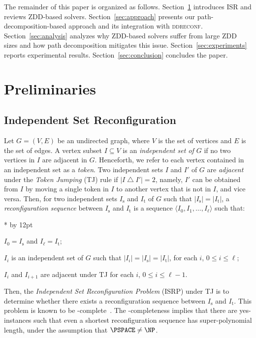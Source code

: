 \documentclass[conference]{IEEEtran}
\newenvironment{listing}[1]{%
        \begin{list}{*}{%
                 \settowidth{\labelwidth}{#1}%
                 \setlength{\leftmargin}{\labelwidth}%
                 \advance \leftmargin by 12pt
                   \setlength{\itemsep}{0pt}%
}%
}{%
\end{list}}
\newcommand{\ini}{\mathrm{s}}
\newcommand{\tar}{\mathrm{t}}
\begin{document}
The remainder of this paper is organized as follows.
Section~\ref{sec:preliminaries} introduces ISR and reviews ZDD-based solvers.
Section~\ref{sec:approach} presents our path-decomposition-based approach and its
integration with \textsc{ddreconf}.
Section~\ref{sec:analysis} analyzes why ZDD-based solvers suffer from large ZDD
sizes and how path decomposition mitigates this issue.
Section~\ref{sec:experiments} reports experimental results.
Section~\ref{sec:conclusion} concludes the paper.



\section{Preliminaries}
\label{sec:preliminaries}

\subsection{Independent Set Reconfiguration}
\label{subsec:isr}


Let $G=(V,E)$ be an undirected graph, where $V$ is the set of vertices and $E$
is the set of edges. A vertex subset $I\subseteq V$ is an \emph{independent set
of $G$} if no two vertices in $I$ are adjacent in $G$.
Henceforth, we refer to each vertex contained in an independent set as a
\emph{token}.
Two independent sets $I$ and $I'$ of $G$ are \emph{adjacent} under the
\emph{Token Jumping} (TJ) rule if $|I \bigtriangleup I'| = 2$, namely, $I'$ can
be obtained from $I$ by moving a single token in $I$ to another vertex that is
not in $I$, and vice versa.
Then, for two independent sets $I_\ini$ and $I_\tar$ of $G$ such that
$|I_\ini|=|I_\tar|$, a \emph{reconfiguration sequence} between $I_\ini$ and
$I_\tar$ is a sequence $\langle I_0, I_1, \ldots, I_\ell \rangle$ such that:
\begin{listing}{-}
\item[-] $I_0 = I_\ini$ and $I_\ell = I_\tar$;
\item[-] $I_i$ is an independent set of $G$ such that $|I_i| = |I_\ini| = |I_\tar|$, for each $i$, $0 \leq i \leq \ell$;
\item[-] $I_i$ and $I_{i+1}$ are adjacent under TJ for each $i$, $0 \le i \le \ell-1$.
\end{listing}
Then, the \emph{Independent Set Reconfiguration Problem} (ISRP) under TJ is to
determine whether there exists a reconfiguration sequence between $I_\ini$ and
$I_\tar$. This problem is known to be \PSPACE-complete~\cite{kamemi12}.
The \PSPACE-completeness implies that there are yes-instances such that even a
shortest reconfiguration sequence has super-polynomial length, under the
assumption that $\PSPACE \neq \NP$.
\end{document}
